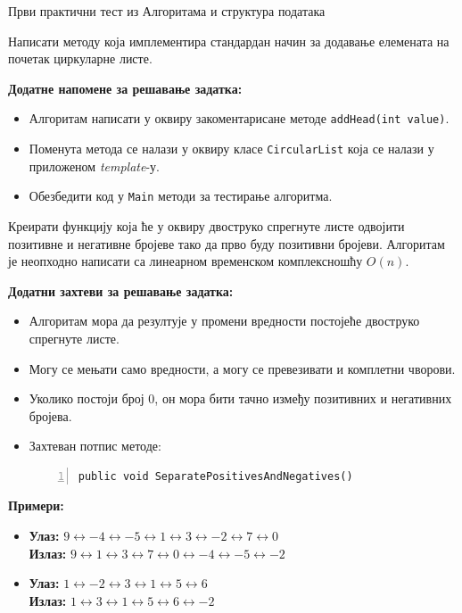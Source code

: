 
Први практични тест из Алгоритама и структура података

Написати методу која имплементира стандардан начин за додавање елемената на почетак циркуларне листе.

\textbf{Додатне напомене за решавање задатка:}
\begin{itemize}
    \item Алгоритам написати у оквиру закоментарисане методе \texttt{addHead(int value)}.
    \item Поменута метода се налази у оквиру класе \texttt{CircularList} која се налази у приложеном \textit{template}-у.
    \item Обезбедити код у \texttt{Main} методи за тестирање алгоритма.
\end{itemize}



Креирати функцију која ће у оквиру двоструко спрегнуте листе одвојити позитивне и негативне бројеве тако да прво буду позитивни бројеви. Алгоритам је неопходно написати са линеарном временском комплексношћу $O(n)$.

\textbf{Додатни захтеви за решавање задатка:}
\begin{itemize}
    \item Алгоритам мора да резултује у промени вредности постојеће двоструко спрегнуте листе.
    \item Могу се мењати само вредности, а могу се превезивати и комплетни чворови.
    \item Уколико постоји број 0, он мора бити тачно између позитивних и негативних бројева.
    \item Захтеван потпис методе:
    \begin{Verbatim}[fontsize=\footnotesize, numbers=left, xleftmargin=10mm]
public void SeparatePositivesAndNegatives()
    \end{Verbatim}
\end{itemize}

\textbf{Примери:}
\begin{itemize}
    \item \textbf{Улаз:} $9 \leftrightarrow -4 \leftrightarrow -5 \leftrightarrow 1 \leftrightarrow 3 \leftrightarrow -2 \leftrightarrow 7 \leftrightarrow 0$ \\
          \textbf{Излаз:} $9 \leftrightarrow 1 \leftrightarrow 3 \leftrightarrow 7 \leftrightarrow 0 \leftrightarrow -4 \leftrightarrow -5 \leftrightarrow -2$
    \item \textbf{Улаз:} $1 \leftrightarrow -2 \leftrightarrow 3 \leftrightarrow 1 \leftrightarrow 5 \leftrightarrow 6$ \\
          \textbf{Излаз:} $1 \leftrightarrow 3 \leftrightarrow 1 \leftrightarrow 5 \leftrightarrow 6 \leftrightarrow -2$
\end{itemize}



